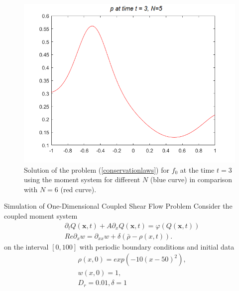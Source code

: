 \begin{frame}
\begin{figure}[H]
\begin{minipage}{0.32\textwidth}
		\end{minipage}
		\hfill
		\begin{minipage}{0.32\textwidth}
			\includegraphics[width=\textwidth]{Bilder_wx/Wavepropa/red=12th_blue=10th_wx=sin(pix)_Awp=0.5sqrt(pi)}
		\end{minipage}
		\caption{Solution of the problem (\ref{conservationlaws}) for $f_0$ at the time $t = 3$ using the moment system for different $N$ (blue curve) in comparison with $N = 6$ (red curve).}
	\end{figure}
\end{frame}

\begin{frame}{Simulation of One-Dimensional Coupled Shear Flow Problem}
\scriptsize
Consider the coupled moment system
\begin{align*}
&\partial_t Q(\boldsymbol{x},t) + A\partial_x Q(\boldsymbol{x},t) =\varphi (Q(\boldsymbol{x},t)) \\
	&Re\partial_{x}w = \partial_{xx}w + \delta(\bar{\rho}-\rho(x,t)).
\end{align*}
on the interval $[0, 100]$ with periodic boundary conditions and initial data
\begin{align*}
	&\rho(x,0) = exp(-10(x-50)^2), \\
	&w(x,0) = 1 ,\\
	&D_r = 0.01, \delta = 1
\end{align*}
\end{frame}